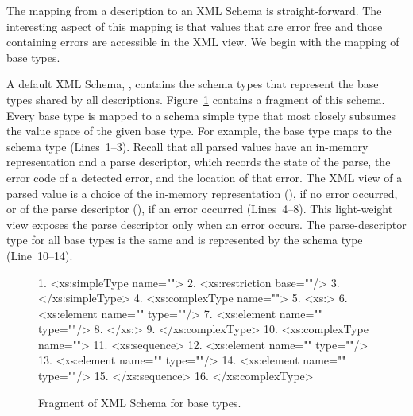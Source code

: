 The mapping from a \pads{} description to an XML Schema is 
straight-forward.  The interesting aspect of this mapping is that
\pads{} values that are error free and those containing errors are
accessible in the XML view.  We begin with the mapping of \pads{} base
types. 

A default XML Schema, , contains the schema types that
represent the \pads{} base types shared by all \pads{} descriptions.
Figure~\ref{figure:pads.xsd} contains a fragment of this schema.
Every \pads{} base type is mapped to a schema simple type that most
closely subsumes the value space of the given \pads{} base type.  For example,
the  base type maps to the schema type 
(Lines~1--3).  Recall that all parsed \pads{} values have an in-memory
representation and a parse descriptor, which records the state of the
parse, the error code of a detected error, and the location of that
error.  The XML view of a parsed value is a choice of the in-memory
representation (), if no error occurred, or of the parse
descriptor (), if
an error occurred (Lines~4--8).  This light-weight view exposes the
parse descriptor only when an error occurs.  The parse-descriptor type
for all base types is the same and is represented by the schema type
 (Line~10--14).

\begin{figure}
\begin{small}
\begin{code}
 1. <xs:simpleType name="">
 2.  <xs:restriction base=""/>
 3. </xs:simpleType>
 4. <xs:complexType name="">
 5.  <xs:>
 6.   <xs:element name="" type=""/>
 7.   <xs:element name=""  type=""/>
 8.  </xs:>
 9. </xs:complexType>
{10}. <xs:complexType name="">
{11}.  <xs:sequence>
{12}.   <xs:element name=""  type=""/>
{13}.   <xs:element name="" type=""/>
{14}.   <xs:element name=""     type=""/>
{15}.  </xs:sequence>
{16}. </xs:complexType>
\end{code}
\end{small}
\caption{Fragment of XML Schema for \pads{} base types.}
\label{figure:pads.xsd}
\end{figure}

